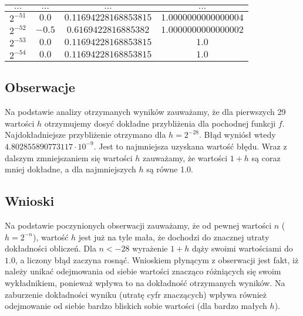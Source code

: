 \documentclass{article}
\begin{document}
\begin{center}
\begin{tabular}{c|c|c|c}
        $\ldots$ & $\ldots$ & $\ldots$ & $\ldots$ \\ \hline
        $2^{-51}$ & $0.0$ & $0.11694228168853815$ & $1.0000000000000004$ \\ \hline
        $2^{-52}$ & $-0.5$ & $0.6169422816885382$ & $1.0000000000000002$ \\ \hline
        $2^{-53}$ & $0.0$ & $0.11694228168853815$ & $1.0$ \\ \hline
        $2^{-54}$ & $0.0$ & $0.11694228168853815$ & $1.0$ \\ \hline
    \end{tabular}
\end{center}

\subsection{Obserwacje}
Na podstawie analizy otrzymanych wyników zauważamy, że dla pierwszych 29 wartości $h$ otrzymujemy dosyć dokładne przybliżenia dla pochodnej funkcji $f$. Najdokładniejsze przybliżenie otrzymano dla $h = 2^{-28}$. Błąd wyniósł wtedy $4.802855890773117 \cdot 10^{-9}$. Jest to najmniejsza uzyskana wartość błędu. Wraz z dalszym zmniejszaniem się wartości $h$ zauważamy, że wartości $1 + h$ są coraz mniej dokładne, a dla najmniejszych $h$ są równe 1.0. 

\subsection{Wnioski}
Na podstawie poczynionych obserwacji zauważamy, że od pewnej wartości $n$ ($h = 2^{-n}$), wartość $h$ jest już na tyle mała, że dochodzi do znacznej utraty dokładności obliczeń. Dla $n < -28$ wyrażenie $1 + h$ dąży swoimi wartościami do $1.0$, a liczony błąd zaczyna rosnąć. Wnioskiem płynącym z obserwacji jest fakt, iż należy unikać odejmowania od siebie wartości znacząco różniących się swoim wykładnikiem, ponieważ wpływa to na dokładność otrzymanych wyników. Na zaburzenie dokładności wyniku (utratę cyfr znaczących) wpływa również odejmowanie od siebie bardzo bliskich sobie wartości (dla bardzo małych $h$).
\end{document}
